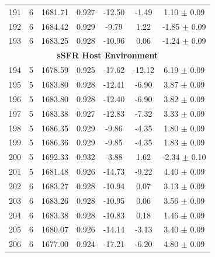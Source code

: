 \begin{longtable}{c c c c c c c}
    191 & 6 & 1681.71 & 0.927 & \cellcolor{aicgreen}-12.50 & -1.49 & \cellcolor{aicyellow}1.10 $\pm$ 0.09 \\
    192 & 6 & 1684.42 & 0.929 & \cellcolor{aiclightgreen}-9.79 & 1.22 & \cellcolor{aicorange}-1.85 $\pm$ 0.09 \\
    193 & 6 & 1683.25 & 0.928 & \cellcolor{aicgreen}-10.96 & 0.06 & \cellcolor{aicorange}-1.24 $\pm$ 0.09 \\
    \hline
    \multicolumn{7}{c}{\textbf{sSFR Host Environment}} \\
    \hline
    194 & 5 & 1678.59 & 0.925 & \cellcolor{aicgreen}-17.62 & \cellcolor{aicgreen}-12.12 & \cellcolor{aicgreen}6.19 $\pm$ 0.09 \\
    195 & 5 & 1683.80 & 0.928 & \cellcolor{aicgreen}-12.41 & \cellcolor{aiclightgreen}-6.90 & \cellcolor{aiclightgreen}3.87 $\pm$ 0.09 \\
    196 & 5 & 1683.80 & 0.928 & \cellcolor{aicgreen}-12.40 & \cellcolor{aiclightgreen}-6.90 & \cellcolor{aiclightgreen}3.82 $\pm$ 0.09 \\
    197 & 5 & 1683.38 & 0.927 & \cellcolor{aicgreen}-12.83 & \cellcolor{aiclightgreen}-7.32 & \cellcolor{aiclightgreen}3.33 $\pm$ 0.09 \\
    198 & 5 & 1686.35 & 0.929 & \cellcolor{aiclightgreen}-9.86 & \cellcolor{aicyellow}-4.35 & \cellcolor{aicyellow}1.80 $\pm$ 0.09 \\
    199 & 5 & 1686.36 & 0.929 & \cellcolor{aiclightgreen}-9.85 & \cellcolor{aicyellow}-4.35 & \cellcolor{aicyellow}1.83 $\pm$ 0.09 \\
    200 & 5 & 1692.33 & 0.932 & \cellcolor{aiclightyellow}-3.88 & 1.62 & \cellcolor{aicorange}-2.34 $\pm$ 0.10 \\
    201 & 5 & 1681.48 & 0.926 & \cellcolor{aicgreen}-14.73 & \cellcolor{aiclightgreen}-9.22 & \cellcolor{aiclightgreen}4.40 $\pm$ 0.09 \\
    202 & 6 & 1683.27 & 0.928 & \cellcolor{aicgreen}-10.94 & 0.07 & \cellcolor{aiclightgreen}3.13 $\pm$ 0.09 \\
    203 & 6 & 1683.26 & 0.928 & \cellcolor{aicgreen}-10.95 & 0.06 & \cellcolor{aiclightgreen}3.56 $\pm$ 0.09 \\
    204 & 6 & 1683.38 & 0.928 & \cellcolor{aicgreen}-10.83 & 0.18 & \cellcolor{aicyellow}1.46 $\pm$ 0.09 \\
    205 & 6 & 1680.07 & 0.926 & \cellcolor{aicgreen}-14.14 & \cellcolor{aiclightyellow}-3.13 & \cellcolor{aiclightgreen}3.40 $\pm$ 0.09 \\
    206 & 6 & 1677.00 & 0.924 & \cellcolor{aicgreen}-17.21 & \cellcolor{aiclightgreen}-6.20 & \cellcolor{aiclightgreen}4.80 $\pm$ 0.09 \\

\end{longtable}
